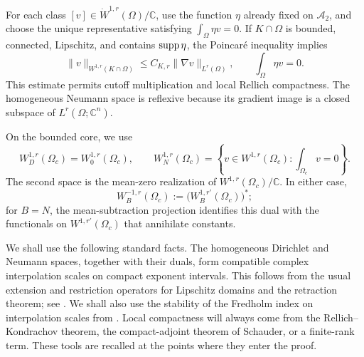 \documentclass[12pt]{amsart}
\newcommand{\supp}{{\rm supp}{\hspace{.05cm}}}
\newcommand{\diver}{\operatorname{div}}
\theoremstyle{remark}
\begin{document}
For each class \([v]\in\dot W^{1,r}(\Omega)/\mathbb C\), use the function
\(\eta\) already fixed on \(\mathcal A_2\), and choose the unique representative
satisfying \(\int_\Omega\eta v=0\).  If \(K\cap\Omega\) is bounded,
connected, Lipschitz, and contains \(\supp\eta\), the Poincar\'e inequality
implies
\begin{equation}\label{eq:homogeneous-local-poincare}
 \|v\|_{W^{1,r}(K\cap\Omega)}
 \leq C_{K,r}\|\nabla v\|_{L^r(\Omega)},
 \qquad \int_\Omega\eta v=0.
\end{equation}
This estimate permits cutoff multiplication and local Rellich compactness.
The homogeneous Neumann space is reflexive because its gradient image is a
closed subspace of \(L^r(\Omega;\mathbb C^n)\).

On the bounded core, we use
\[
 W_D^{1,r}(\Omega_c)=W^{1,r}_0(\Omega_c),\qquad
 W_N^{1,r}(\Omega_c)
 =\left\{v\in W^{1,r}(\Omega_c):\int_{\Omega_c}v=0\right\}.
\]
The second space is the mean-zero realization of
\(W^{1,r}(\Omega_c)/\mathbb C\).  In either case,
\[
 W_B^{-1,r}(\Omega_c)
 :=\bigl(W_B^{1,r'}(\Omega_c)\bigr)^*;
\]
for \(B=N\), the mean-subtraction projection identifies this dual with
the functionals on \(W^{1,r'}(\Omega_c)\) that annihilate constants.




We shall use the following standard facts.  The homogeneous Dirichlet and
Neumann spaces, together with their duals, form compatible complex
interpolation scales on compact exponent intervals.  This follows from the
usual extension and restriction operators for Lipschitz domains and the
retraction theorem; see \cite[Chapter~6]{BerghLofstrom}.  We shall also use
the stability of the Fredholm index on interpolation scales from
\cite{KaltonMitrea98}.  Local compactness will always come from the
Rellich--Kondrachov theorem, the compact-adjoint theorem of Schauder, or a
finite-rank term.  These tools are recalled at the points where they enter
the proof.

\end{document}
